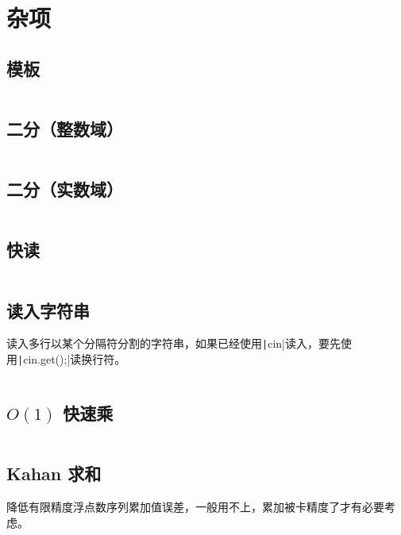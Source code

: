 \documentclass[a4paper, twoside]{article}
\begin{document}



\newpage
\section{杂项}
\subsection{模板}
\inputminted{cpp}{../src/杂项/模板.cpp}

\subsection{二分（整数域）}
\inputminted{cpp}{../src/杂项/二分（整数域）.cpp}

\subsection{二分（实数域）}
\inputminted{cpp}{../src/杂项/二分（实数域）.cpp}

\subsection{快读}
\inputminted{cpp}{../src/杂项/快读.cpp}

\subsection{读入字符串}
读入多行以某个分隔符分割的字符串，如果已经使用\texttt|cin|读入，要先使用\texttt|cin.get();|读换行符。
\inputminted{cpp}{../src/杂项/读入字符串.cpp}

\subsection{$O(1)$ 快速乘}
\inputminted{cpp}{../src/杂项/O(1)快速乘.cpp}

\subsection{Kahan 求和}
降低有限精度浮点数序列累加值误差，一般用不上，累加被卡精度了才有必要考虑。
\inputminted{cpp}{../src/杂项/Kahan求和.cpp}
\end{document}
